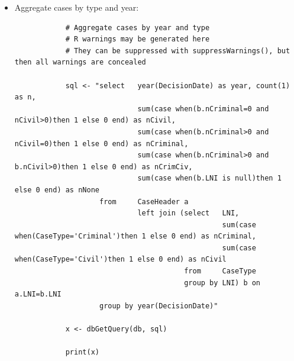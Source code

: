 \documentclass[10pt, letterpaper]{article}
\begin{document}
\begin{spacing}{1.0}
\begin{itemize}
    \item Aggregate cases by type and year:
    \scriptsize
    \begin{verbatim}
            # Aggregate cases by year and type
            # R warnings may be generated here
            # They can be suppressed with suppressWarnings(), but then all warnings are concealed

            sql <- "select   year(DecisionDate) as year, count(1) as n,
                             sum(case when(b.nCriminal=0 and nCivil>0)then 1 else 0 end) as nCivil,
                             sum(case when(b.nCriminal>0 and nCivil=0)then 1 else 0 end) as nCriminal,
                             sum(case when(b.nCriminal>0 and b.nCivil>0)then 1 else 0 end) as nCrimCiv,
                             sum(case when(b.LNI is null)then 1 else 0 end) as nNone
                    from     CaseHeader a
                             left join (select   LNI,
                                                 sum(case when(CaseType='Criminal')then 1 else 0 end) as nCriminal,
                                                 sum(case when(CaseType='Civil')then 1 else 0 end) as nCivil
                                        from     CaseType
                                        group by LNI) b on a.LNI=b.LNI
                    group by year(DecisionDate)"

            x <- dbGetQuery(db, sql)
                    
            print(x)
            

\end{verbatim}
\end{itemize}
\end{spacing}
\end{document}
